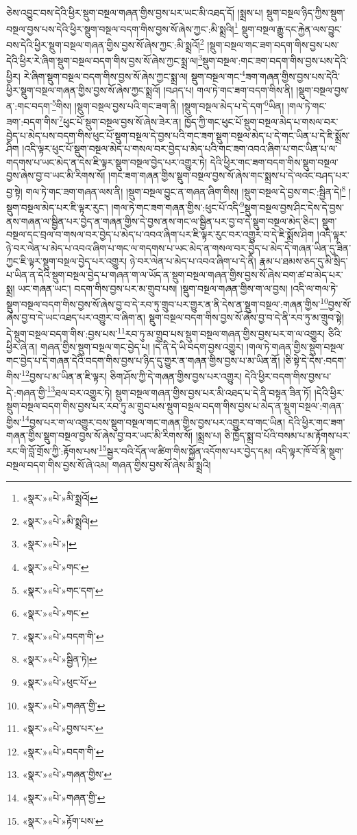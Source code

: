 ཅེས་འབྱུང་བས་དེའི་ཕྱིར་སྡུག་བསྔལ་གཞན་གྱིས་བྱས་པར་ཡང་མི་འཐད་དོ། །སྨྲས་པ། སྡུག་བསྔལ་ཉིད་ཀྱིས་སྡུག་བསྔལ་བྱས་པས་དེའི་ཕྱིར་སྡུག་བསྔལ་བདག་གིས་བྱས་སོ་ཞེས་ཀྱང་:མི་སྨྲའི།\footnote{«སྣར་»«པེ་»མི་སྨྲའོ།} སྡུག་བསྔལ་རྒྱུ་དང་རྐྱེན་ལས་བྱུང་བས་དེའི་ཕྱིར་སྡུག་བསྔལ་གཞན་གྱིས་བྱས་སོ་ཞེས་ཀྱང་:མི་སྨྲའོ།\footnote{«སྣར་»«པེ་»མི་སྨྲའི།} །སྡུག་བསྔལ་གང་ཟག་བདག་གིས་བྱས་པས་དེའི་ཕྱིར་རེ་ཞིག་སྡུག་བསྔལ་བདག་གིས་བྱས་སོ་ཞེས་ཀྱང་སྨྲ་ལ།\footnote{«སྣར་»«པེ་»། }སྡུག་བསྔལ་:གང་ཟག་བདག་གིས་བྱས་པས་དེའི་ཕྱིར། རེ་ཞིག་སྡུག་བསྔལ་བདག་གིས་བྱས་སོ་ཞེས་ཀྱང་སྨྲ་ལ། སྡུག་བསྔལ་གང་\footnote{«སྣར་»«པེ་»གང་}ཟག་གཞན་གྱིས་བྱས་པས་དེའི་ཕྱིར་སྡུག་བསྔལ་གཞན་གྱིས་བྱས་སོ་ཞེས་ཀྱང་སྨྲའོ། །བཤད་པ། གལ་ཏེ་གང་ཟག་བདག་གིས་ནི། །སྡུག་བསྔལ་བྱས་ན་:གང་བདག་\footnote{«སྣར་»«པེ་»གང་དག་}གིས། །སྡུག་བསྔལ་བྱས་པའི་གང་ཟག་ནི། །སྡུག་བསྔལ་མེད་པ་དེ་དག་\footnote{«སྣར་»«པེ་»གང་}ཡིན། །གལ་ཏེ་གང་ཟག་:བདག་གིས་\footnote{«སྣར་»«པེ་»བདག་གི་}ཕུང་པོ་སྡུག་བསྔལ་བྱས་སོ་ཞེས་ཟེར་ན། ཁྱོད་ཀྱི་གང་ཕུང་པོ་སྡུག་བསྔལ་མེད་པ་གསལ་བར་བྱེད་པ་མེད་པས་བདག་གིས་ཕུང་པོ་སྡུག་བསྔལ་དེ་བྱས་པའི་གང་ཟག་སྡུག་བསྔལ་མེད་པ་དེ་གང་ཡིན་པ་དེ་ཇི་སྨྲོས་ཤིག །འདི་ལྟར་ཕུང་པོ་སྡུག་བསྔལ་མེད་པ་གསལ་བར་བྱེད་པ་མེད་པའི་གང་ཟག་འབའ་ཞིག་པ་གང་ཡིན་པ་ལ་གདགས་པ་ཡང་མེད་ན་དེས་ཇི་ལྟར་སྡུག་བསྔལ་བྱེད་པར་འགྱུར་ཏེ། དེའི་ཕྱིར་གང་ཟག་བདག་གིས་སྡུག་བསྔལ་བྱས་ཞེས་བྱ་བ་ཡང་མི་རིགས་སོ། །གང་ཟག་གཞན་གྱིས་སྡུག་བསྔལ་བྱས་སོ་ཞེས་གང་སྨྲས་པ་དེ་ལའང་བཤད་པར་བྱ་སྟེ། གལ་ཏེ་གང་ཟག་གཞན་ལས་ནི། །སྡུག་བསྔལ་བྱུང་ན་གཞན་ཞིག་གིས། །སྡུག་བསྔལ་དེ་བྱས་གང་:སྦྱིན་དེ།\footnote{«སྣར་»«པེ་»སྦྱིན་ཏེ།} །སྡུག་བསྔལ་མེད་པར་ཇི་ལྟར་རུང་། །གལ་ཏེ་གང་ཟག་གཞན་གྱིས་:ཕུང་པོ་འདི་\footnote{«སྣར་»«པེ་»ཕུང་པོ་}སྡུག་བསྔལ་བྱས་ཤིང་དེས་དེ་བྱས་ནས་གཞན་ལ་སྦྱིན་པར་བྱེད་ན་གཞན་གྱིས་དེ་བྱས་ནས་གང་ལ་སྦྱིན་པར་བྱ་བ་དེ་སྡུག་བསྔལ་མེད་ཅིང་། སྡུག་བསྔལ་དང་བྲལ་བ་གསལ་བར་བྱེད་པ་མེད་པ་འབའ་ཞིག་པར་ཇི་ལྟར་རུང་བར་འགྱུར་བ་དེ་ཇི་སྨྲོས་ཤིག །འདི་ལྟར་ཉེ་བར་ལེན་པ་མེད་པ་འབའ་ཞིག་པ་གང་ལ་གདགས་པ་ཡང་མེད་ན་གསལ་བར་བྱེད་པ་མེད་དེ་གཞན་ཡིན་དུ་ཟིན་ཀྱང་ཇི་ལྟར་སྡུག་བསྔལ་བྱེད་པར་འགྱུར། ཉེ་བར་ལེན་པ་མེད་པ་འབའ་ཞིག་པ་དེ་ནི། རྣམ་པ་ཐམས་ཅད་དུ་མི་སྲིད་པ་ཡིན་ན་དེའི་སྡུག་བསྔལ་བྱེད་པ་གཞན་ག་ལ་ཡོད་ན་སྡུག་བསྔལ་གཞན་གྱིས་བྱས་སོ་ཞེས་བག་ཚ་བ་མེད་པར་སྨྲ། ཡང་གཞན་ཡང་། བདག་གིས་བྱས་པར་མ་གྲུབ་པས། །སྡུག་བསྔལ་གཞན་གྱིས་ག་ལ་བྱས། །འདི་ལ་གལ་ཏེ་སྡུག་བསྔལ་བདག་གིས་བྱས་སོ་ཞེས་བྱ་བ་དེ་རབ་ཏུ་གྲུབ་པར་གྱུར་ན་ནི་དེས་ན་སྡུག་བསྔལ་:གཞན་གྱིས་\footnote{«སྣར་»«པེ་»གཞན་གྱི་}བྱས་སོ་ཞེས་བྱ་བ་དེ་ཡང་འཐད་པར་འགྱུར་བ་ཞིག་ན། སྡུག་བསྔལ་བདག་གིས་བྱས་སོ་ཞེས་བྱ་བ་དེ་ནི་རབ་ཏུ་མ་གྲུབ་སྟེ། དེ་སྡུག་བསྔལ་བདག་གིས་:བྱས་པས་\footnote{«སྣར་»«པེ་»བྱས་པར་}རབ་ཏུ་མ་གྲུབ་པས་སྡུག་བསྔལ་གཞན་གྱིས་བྱས་པར་ག་ལ་འགྱུར། ཅིའི་ཕྱིར་ཞེ་ན། གཞན་གྱིས་སྡུག་བསྔལ་གང་བྱེད་པ། །དེ་ནི་དེ་ཡི་བདག་བྱས་འགྱུར། །གལ་ཏེ་གཞན་གྱིས་སྡུག་བསྔལ་གང་བྱེད་པ་དེ་གཞན་དེའི་བདག་གིས་བྱས་པ་ཉིད་དུ་གྱུར་ན་གཞན་གྱིས་བྱས་པ་མ་ཡིན་ནོ། །ཅི་སྟེ་དེ་དེས་:བདག་གིས་\footnote{«སྣར་»«པེ་»བདག་གི་}བྱས་པ་མ་ཡིན་ན་ཇི་ལྟར། ཅིག་ཤོས་ཀྱི་དེ་གཞན་གྱིས་བྱས་པར་འགྱུར། དེའི་ཕྱིར་བདག་གིས་བྱས་པ་དེ་:གཞན་གྱི་\footnote{«སྣར་»«པེ་»གཞན་གྱིས་}ཐལ་བར་འགྱུར་ཏེ། སྡུག་བསྔལ་གཞན་གྱིས་བྱས་པར་མི་འཐད་པ་དེ་ནི་བསྟན་ཟིན་ཏོ། །དེའི་ཕྱིར་སྡུག་བསྔལ་བདག་གིས་བྱས་པར་རབ་ཏུ་མ་གྲུབ་པས་སྡུག་བསྔལ་བདག་གིས་བྱས་པ་མེད་ན་སྡུག་བསྔལ་:གཞན་གྱིས་\footnote{«སྣར་»«པེ་»གཞན་གྱི་}བྱས་པར་ག་ལ་འགྱུར་བས་སྡུག་བསྔལ་གང་གཞན་གྱིས་བྱས་པར་འགྱུར་བ་གང་ཡིན། དེའི་ཕྱིར་གང་ཟག་གཞན་གྱིས་སྡུག་བསྔལ་བྱས་སོ་ཞེས་བྱ་བར་ཡང་མི་རིགས་སོ། །སྨྲས་པ། ཅི་ཁྱོད་སྨྲ་བ་པོའི་བསམ་པ་མ་རྟོགས་པར་རང་གི་བློ་གྲོས་ཀྱི་:རྟོགས་པས་\footnote{«སྣར་»«པེ་»རྟོག་པས་}སྦྱར་བའི་དོན་ལ་ཚིག་གིས་སྐྱོན་འདོགས་པར་བྱེད་དམ། འདི་ལྟར་ཁོ་བོ་ནི་སྡུག་བསྔལ་བདག་གིས་བྱས་སོ་ཞེ་འམ། གཞན་གྱིས་བྱས་སོ་ཞེས་མི་སྨྲའི། 